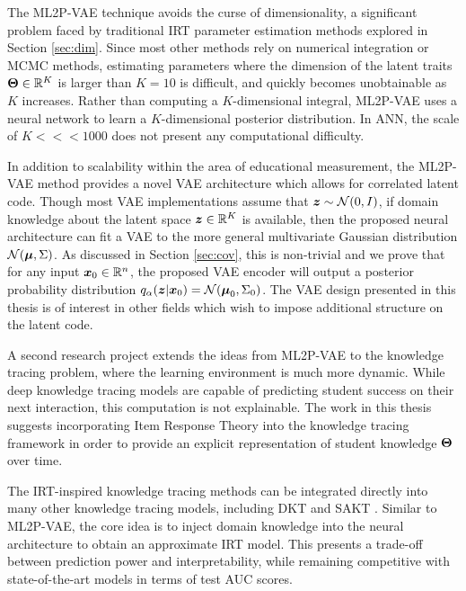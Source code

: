 The ML2P-VAE technique avoids the curse of dimensionality, a significant problem faced by traditional IRT parameter estimation methods explored in Section \ref{sec:dim}. Since most other methods rely on numerical integration or MCMC methods, estimating parameters where the dimension of the latent traits $\boldsymbol{\Theta} \in\mathbb{R}^K$ is larger than $K=10$ is difficult, and quickly becomes unobtainable as $K$ increases. Rather than computing a $K$-dimensional integral, ML2P-VAE uses a neural network to learn a $K$-dimensional posterior distribution. In ANN, the scale of $K <<< 1000$  does not present any computational difficulty.

In addition to scalability within the area of educational measurement, the ML2P-VAE method provides a novel VAE architecture which allows for correlated latent code. Though most VAE implementations assume that $\boldsymbol{z} \sim \mathcal{N}(0,I)$, if domain knowledge about the latent space $\boldsymbol{z} \in \mathbb{R}^K$ is available, then the proposed neural architecture can fit a VAE to the more general multivariate Gaussian distribution $\mathcal{N}(\boldsymbol{\mu}, \Sigma)$. As discussed in Section \ref{sec:cov}, this is non-trivial and we prove that for any input $\boldsymbol{x}_0 \in \mathbb{R}^n$, the proposed VAE encoder will output a posterior probability distribution $q_\alpha(\boldsymbol{z} | \boldsymbol{x}_0) = \mathcal{N}(\boldsymbol{\mu}_0, \Sigma_0)$. The VAE design presented in this thesis is of interest in other fields which wish to impose additional structure on the latent code.

A second research project extends the ideas from ML2P-VAE to the knowledge tracing problem, where the learning environment is much more dynamic. While deep knowledge tracing models are capable of predicting student success on their next interaction, this computation is not explainable. The work in this thesis suggests incorporating Item Response Theory into the knowledge tracing framework in order to provide an explicit representation of student knowledge $\boldsymbol{\Theta}$ over time.

The IRT-inspired knowledge tracing methods can be integrated directly into many other knowledge tracing models, including DKT \cite{piech2015} and SAKT \cite{pandey2019}. Similar to ML2P-VAE, the core idea is to inject domain knowledge into the neural architecture to obtain an approximate IRT model. This presents a trade-off between prediction power and interpretability, while remaining competitive with state-of-the-art models in terms of test AUC scores.

